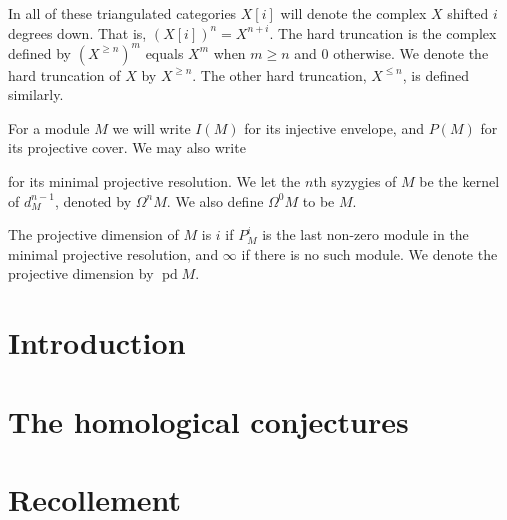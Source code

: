 \documentclass[11pt, a4paper, english]{article}
\theoremstyle{definition}
\DeclareMathOperator{\pd}{pd}
\DeclareMathOperator{\D}{\mathscr{D}}
\begin{document}
In all of these triangulated categories $X[i]$ will denote the complex $X$ shifted $i$ degrees down. That is, $(X[i])^n = X^{n+i}$. The hard truncation is the complex defined by $(X^{\geq n})^m$ equals $X^m$ when $m \geq n$ and 0 otherwise. We denote the hard truncation of $X$ by $X^{\geq n}$. The other hard truncation, $X^{\leq n}$, is defined similarly.


For a module $M$ we will write $I(M)$ for its injective envelope, and $P(M)$ for its projective cover. We may also write 
\begin{center}
\end{center} 
for its minimal projective resolution. We let the $n$th syzygies of $M$ be the kernel of $d_M^{n-1}$, denoted by $\Omega^n M$. We also define $\Omega^0 M$ to be $M$.

The projective dimension of $M$ is $i$ if $P_M^i$ is the last non-zero module in the minimal projective resolution, and $\infty$ if there is no such module. We denote the projective dimension by $\pd M$.


\newpage

\section*{Introduction}
%



\section{The homological conjectures}


\section{Recollement}

\end{document}
